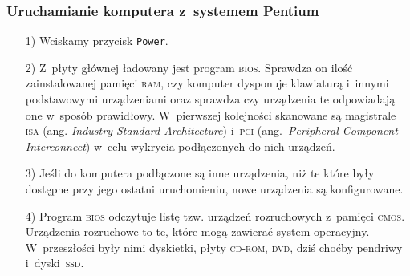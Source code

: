 \documentclass[10pt,t]{beamer}
\begin{document}
\begin{frame}
  \frametitle{Uruchamianie komputera z~systemem Pentium}


  \begin{itemize}

  \item[1)] Wciskamy przycisk \texttt{Power}.

  \item[2)] Z~płyty głównej ładowany jest program \textsc{bios}. Sprawdza on
    ilość zainstalowanej pamięci \textsc{ram}, czy komputer dysponuje
    klawiaturą i~innymi podstawowymi urządzeniami oraz sprawdza czy
    urządzenia te odpowiadają one w~sposób prawidłowy. W~pierwszej
    kolejności skanowane są magistrale \textsc{isa}
    (ang. \textit{Industry Standard Architecture}) i~\textsc{pci}
    (ang.~\textit{Peripheral Component Interconnect}) w~celu wykrycia
    podłączonych do nich urządzeń.

  \item[3)] Jeśli do komputera podłączone są inne urządzenia, niż te które
    były dostępne przy jego ostatni uruchomieniu, nowe urządzenia są
    konfigurowane.

  \item[4)] Program \textsc{bios} odczytuje listę tzw. urządzeń rozruchowych
    z~pamięci \textsc{cmos}. Urządzenia rozruchowe to te, które mogą
    zawierać system operacyjny. W~przeszłości były nimi dyskietki, płyty
    \textsc{cd}-\textsc{rom}, \textsc{dvd}, dziś choćby pendriwy
    i~dyski~\textsc{ssd}.

  \end{itemize}

\end{frame}
\end{document}
